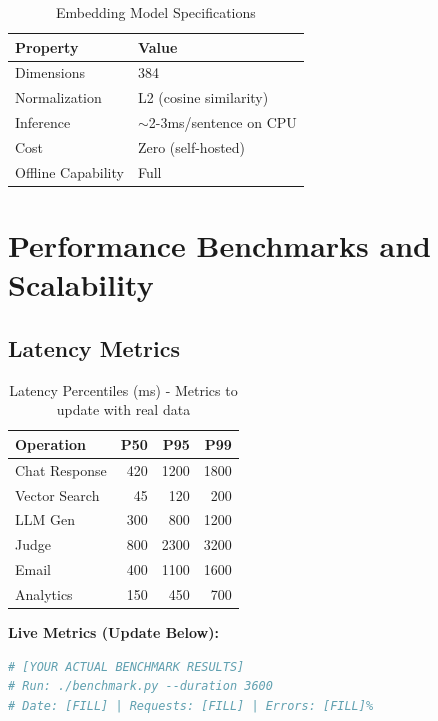 \documentclass[10pt,twocolumn,a4paper]{article}
\begin{document}
\begin{table}[H]
\centering
\small
\begin{tabular}{|l|l|}
\hline
\textbf{Property} & \textbf{Value} \\
\hline
Dimensions & 384 \\
Normalization & L2 (cosine similarity) \\
Inference & $\sim$2-3ms/sentence on CPU \\
Cost & Zero (self-hosted) \\
Offline Capability & Full \\
\hline
\end{tabular}
\caption{Embedding Model Specifications}
\label{tab:embeddings}
\end{table}


\section{Performance Benchmarks and Scalability}

\subsection{Latency Metrics}

\begin{table}[H]
\centering
\small
\begin{tabular}{|l|r|r|r|}
\hline
\textbf{Operation} & \textbf{P50} & \textbf{P95} & \textbf{P99} \\
\hline
Chat Response & 420 & 1200 & 1800 \\
Vector Search & 45 & 120 & 200 \\
LLM Gen & 300 & 800 & 1200 \\
Judge & 800 & 2300 & 3200 \\
Email & 400 & 1100 & 1600 \\
Analytics & 150 & 450 & 700 \\
\hline
\end{tabular}
\caption{Latency Percentiles (ms) - Metrics to update with real data}
\label{tab:latency}
\end{table}

\textbf{Live Metrics (Update Below):}
\begin{lstlisting}[language=bash]
# [YOUR ACTUAL BENCHMARK RESULTS]
# Run: ./benchmark.py --duration 3600
# Date: [FILL] | Requests: [FILL] | Errors: [FILL]%
\end{lstlisting}
\end{document}
